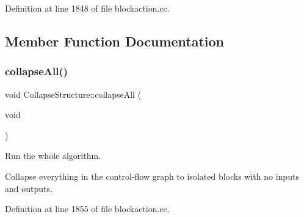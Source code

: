 Definition at line 1848 of file blockaction.\+cc.



\subsection{Member Function Documentation}
\mbox{\label{class_collapse_structure_a5e36c78c71bf1ded2090424af870b7a0}} 
\subsubsection{\texorpdfstring{collapseAll()}{collapseAll()}}
{\footnotesize\ttfamily void Collapse\+Structure\+::collapse\+All (\begin{DoxyParamCaption}\item[{void}]{ }\end{DoxyParamCaption})}



Run the whole algorithm. 

Collapse everything in the control-\/flow graph to isolated blocks with no inputs and outputs. 

Definition at line 1855 of file blockaction.\+cc.

